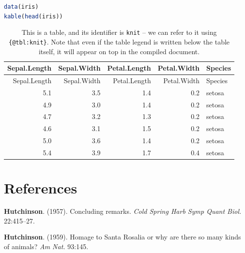 \documentclass[12pt]{article}
\begin{document}
\begin{lstlisting}[language=R]
data(iris)
kable(head(iris))
\end{lstlisting}

\begin{longtable}[]{@{}rrrrl@{}}
\caption{This is a table, and its identifier is \lstinline!knit! -- we
can refer to it using \lstinline!{@tbl:knit}!. Note that even if the
table legend is written below the table itself, it will appear on top in
the compiled document. \label{tbl:knit}}\tabularnewline
\toprule
Sepal.Length & Sepal.Width & Petal.Length & Petal.Width &
Species\tabularnewline
\midrule
\endfirsthead
\toprule
Sepal.Length & Sepal.Width & Petal.Length & Petal.Width &
Species\tabularnewline
\midrule
\endhead
5.1 & 3.5 & 1.4 & 0.2 & setosa\tabularnewline
4.9 & 3.0 & 1.4 & 0.2 & setosa\tabularnewline
4.7 & 3.2 & 1.3 & 0.2 & setosa\tabularnewline
4.6 & 3.1 & 1.5 & 0.2 & setosa\tabularnewline
5.0 & 3.6 & 1.4 & 0.2 & setosa\tabularnewline
5.4 & 3.9 & 1.7 & 0.4 & setosa\tabularnewline
\bottomrule
\end{longtable}

\section*{References}\label{references}

\hypertarget{refs}{}
\hypertarget{ref-hutc57cr}{}
\textbf{Hutchinson}. (1957). Concluding remarks. \emph{Cold Spring Harb
Symp Quant Biol.} 22:415--27.

\hypertarget{ref-hutc59hsr}{}
\textbf{Hutchinson}. (1959). Homage to Santa Rosalia or why are there so
many kinds of animals? \emph{Am Nat.} 93:145.
\end{document}
